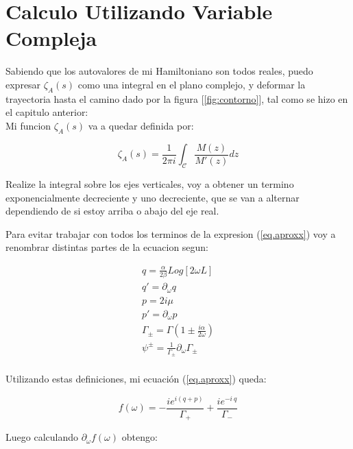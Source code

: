 \section{Calculo Utilizando Variable Compleja}


Sabiendo que los autovalores de mi Hamiltoniano son todos reales, puedo expresar $\zeta _A (s)$ como una integral en el plano complejo, y deformar la trayectoria hasta el camino dado por la figura [\ref{fig:contorno}], tal como se hizo en el capitulo anterior: \\

Mi funcion $ \zeta _A (s) $ va a quedar definida por:

\begin{equation}
\zeta _A (s) = 
\frac{1}{2 \pi i} 
\int _{\mathcal{C}}
\frac{M (z) }{ M' (z) } dz
\end{equation}


Realize la integral sobre los ejes verticales, voy a obtener un termino exponencialmente decreciente y uno decreciente, que se van a alternar dependiendo de si estoy arriba o abajo del eje real.



Para evitar trabajar con todos los terminos de la expresion (\ref{eq.aproxx}) voy a renombrar distintas partes de la ecuacion segun:

\begin{equation}
\begin{array}{c}
    q = \frac{\alpha}{2 \beta} Log[2 \omega L] \\
    q' = \partial _\omega q \\
    p = 2 i \mu \\
    p' = \partial _\omega p \\
    \Gamma _{\pm} = \Gamma(1 \pm \frac{i \alpha}{2 \omega}) \\
    \psi ^{\pm} = \frac{1}{\Gamma _{\pm}} \partial _{\omega}  \Gamma _{\pm} \\
\end{array}
\end{equation}

Utilizando estas definiciones, mi ecuación (\ref{eq.aproxx}) queda:

\begin{equation}
    f(\omega) = - \frac{i e^{i(q+p)}}
    {\Gamma _{+}} +
    \frac{i e^{- i \ q}}
    {\Gamma _{-}}
\end{equation}

Luego calculando $\partial _{\omega} f(\omega)$ obtengo:

